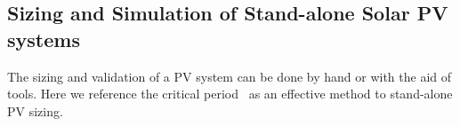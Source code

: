 \documentclass[review]{elsarticle}
\begin{document}
\subsection{Sizing and Simulation of Stand-alone Solar PV systems}
The sizing and validation of a PV system can be done by hand or with the aid of tools. Here we reference the critical period~\citep{Pinho} as an effective method to stand-alone PV sizing.
%
%
\end{document}
